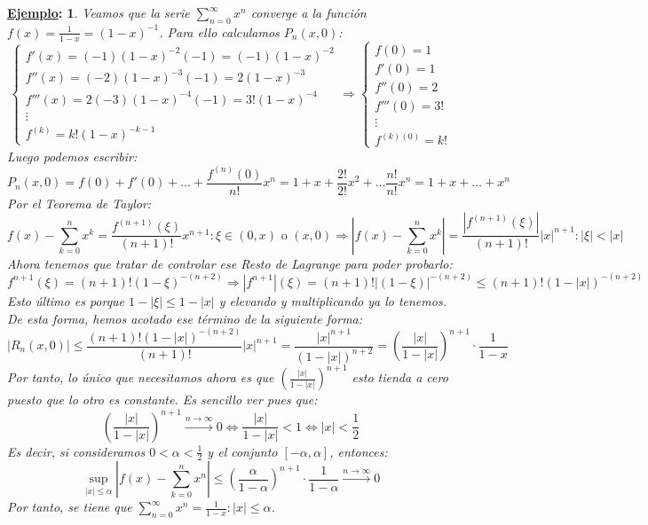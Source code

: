 \documentclass[10pt,a4paper,openright]{book}
\theoremstyle{break}
\newtheorem*{ej}{\underline{Ejemplo}:}
\begin{document}
\begin{ej}
Veamos que la serie $\sum_{n = 0}^{\infty} x^n$ converge a la función $f(x) = \frac{1}{1-x} = (1-x)^{-1}$. Para ello calculamos $P_n(x,0)$:
$$\begin{cases} f'(x) = (-1) (1-x)^{-2} (-1) = (-1) (1-x)^{-2} \\
f''(x) = (-2) (1-x)^{-3} (-1) = 2 (1-x)^{-3} \\
f'''(x) = 2 (-3) (1-x)^{-4} (-1) = 3! (1-x)^{-4} \\
\vdots \\
f^{(k)} = k! (1-x)^{-k - 1}
\end{cases} \Rightarrow \begin{cases} f(0) = 1 \\ f'(0) = 1 \\ f''(0) = 2 \\ f'''(0) = 3! \\ \vdots \\ f^{(k)(0)} = k! \end{cases}$$
Luego podemos escribir:
$$P_n (x, 0) = f(0) + f'(0) + \ldots + \frac{f^{(n)} (0)}{n!} x^n = 1+  x + \frac{2!}{2!} x^2 + \ldots \frac{n!}{n!} x^n = 1+ x + \ldots + x^n$$
Por el Teorema de Taylor:
$$f(x) - \sum_{k=0}^{n} x^k = \frac{f^{(n+1)}(\xi)}{(n+1)!} x^{n+1} : \xi \in (0,x) \mbox{ o } (x, 0) \Rightarrow \left| f(x) - \sum_{k=0}^{n} x^k \right|= \frac{|f^{(n+1)} (\xi)|}{(n+1)!} |x|^{n+1} : |\xi| < |x|$$
Ahora tenemos que tratar de controlar ese Resto de Lagrange para poder probarlo:
$$f^{n+1} (\xi) = (n+1)! (1-\xi)^{- (n+2)} \Rightarrow |f^{n+1}| (\xi) = (n+1)! |(1-\xi)|^{- (n+2)} \leq (n+1)! (1 - |x|)^{- (n+2)} $$
Esto último es porque $1-|\xi| \leq 1 - |x|$ y elevando y multiplicando ya lo tenemos. De esta forma, hemos acotado ese término de la siguiente forma:
$$|R_n (x,0) | \leq \frac{(n+1) ! (1 - |x|)^{- (n+2)} }{(n+1)!} |x|^{n+1} = \frac{|x|^{n+1}}{(1 - |x|)^ {n+2}} = \left(\frac{|x|}{1-|x|}\right)^{n+1} \cdot \frac{1}{1-x}$$
Por tanto, lo único que necesitamos ahora es que $\left(\frac{|x|}{1-|x|}\right)^{n+1}$ esto tienda a cero puesto que lo otro es constante. Es sencillo ver pues que:
$$\left(\frac{|x|}{1-|x|}\right)^{n+1} \xrightarrow{n\rightarrow\infty} 0\Leftrightarrow \frac{|x|}{1-|x|} < 1 \Leftrightarrow |x| < \frac{1}{2}$$
Es decir, si consideramos  $0 < \alpha < \frac{1}{2}$ y el conjunto $[-\alpha, \alpha]$, entonces:
$$\underset{|x| \leq \alpha} {\sup} \left|f(x) - \sum_{k=0}^{n} x^n\right| \leq \left(\frac{\alpha}{1 - \alpha}\right)^{n+1} \cdot \frac{1}{1-\alpha} \xrightarrow{n\rightarrow\infty} 0$$
Por tanto, se tiene que $\sum_{n=0}^{\infty} x^n = \frac{1}{1-x} : |x| \leq \alpha$.
\end{ej}
\end{document}
